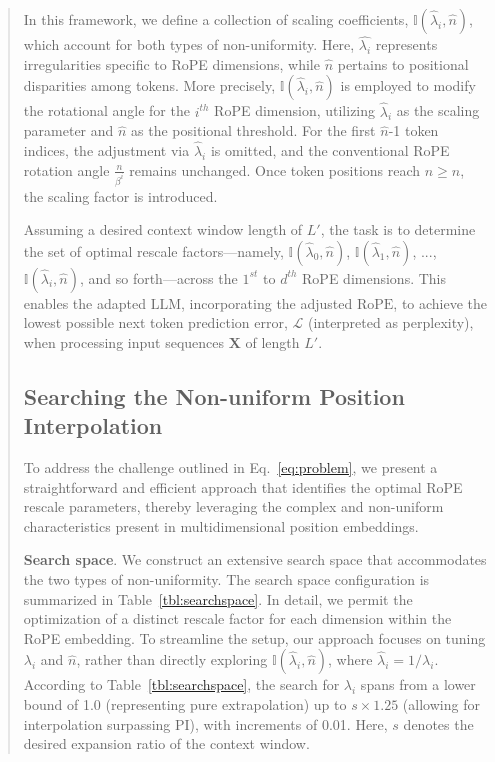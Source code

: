 \begin{abstract}
In this framework, we define a collection of scaling coefficients, $\mathbb{I}(\hat{\lambda}_{i},\hat{n})$, which account for both types of non-uniformity. Here, $\hat{\lambda_i}$ represents irregularities specific to RoPE dimensions, while $\hat{n}$ pertains to positional disparities among tokens. More precisely, $\mathbb{I}(\hat{\lambda}_{i},\hat{n})$ is employed to modify the rotational angle for the $i^{th}$ RoPE dimension, utilizing $\hat\lambda_{i}$ as the scaling parameter and $\hat{n}$ as the positional threshold. For the first $\hat{n}$-1 token indices, the adjustment via $\hat\lambda_{i}$ is omitted, and the conventional RoPE rotation angle $\frac{n}{\beta^i}$ remains unchanged. Once token positions reach $n\ge\hat{n}$, the scaling factor is introduced.

Assuming a desired context window length of $L'$, the task is to determine the set of optimal rescale factors—namely, $\mathbb{I}(\hat{\lambda}_{0},\hat{n})$, $\mathbb{I}(\hat{\lambda}_{1},\hat{n})$, ..., $\mathbb{I}(\hat{\lambda}_{i},\hat{n})$, and so forth—across the $1^{st}$ to $d^{th}$ RoPE dimensions. This enables the adapted $\text{LLM}$, incorporating the adjusted $\text{RoPE}$, to achieve the lowest possible next token prediction error, $\mathcal{L}$ (interpreted as perplexity), when processing input sequences $\mathbf{X}$ of length $L'$.

\subsection{Searching the Non-uniform Position Interpolation}

To address the challenge outlined in Eq.~\ref{eq:problem}, we present a straightforward and efficient approach that identifies the optimal RoPE rescale parameters, thereby leveraging the complex and non-uniform characteristics present in multidimensional position embeddings.

\textbf{Search space}. We construct an extensive search space that accommodates the two types of non-uniformity. The search space configuration is summarized in Table~\ref{tbl:searchspace}. In detail, we permit the optimization of a distinct rescale factor for each dimension within the RoPE embedding. To streamline the setup, our approach focuses on tuning $\lambda_i$ and $\hat{n}$, rather than directly exploring $\mathbb{I}(\hat{\lambda}_{i},\hat{n})$, where  $\hat{\lambda}_{i}=1/\lambda_i$. 
According to Table~\ref{tbl:searchspace}, the search for $\lambda_i$ spans from a lower bound of 1.0 (representing pure extrapolation) up to $s\times1.25$ (allowing for interpolation surpassing PI), with increments of 0.01. Here, $s$ denotes the desired expansion ratio of the context window.


\end{abstract}
